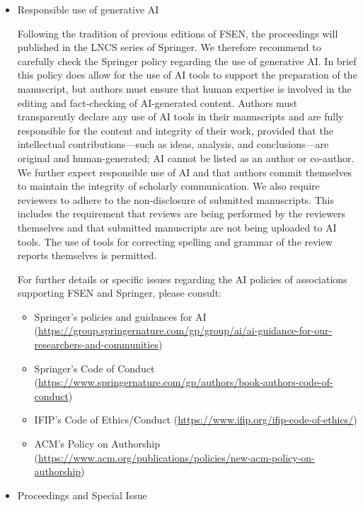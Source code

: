 \documentclass[prodmode,acmtecs]{acmsmall} %
\begin{document}
\begin{itemize}
\item  Responsible use of generative AI 
 
  Following the tradition of previous editions of FSEN, the proceedings will published in the LNCS series of Springer. We therefore recommend to carefully check the Springer policy regarding the use of generative AI. In brief this policy does allow for the use of AI tools to support the preparation of the manuscript, but authors must ensure that human expertise is involved in the editing and fact-checking of AI-generated content. Authors must transparently declare any use of AI tools in their manuscripts and are fully responsible for the content and integrity of their work, provided that the intellectual contributions—such as ideas, analysis, and conclusions—are original and human-generated; AI cannot be listed as an author or co-author. We further expect responsible use of AI and that authors commit themselves to maintain the integrity of scholarly communication. We also require reviewers to adhere to the non-disclosure of submitted manuscripts. This includes the requirement that reviews are being performed by the reviewers themselves and that submitted manuscripts are not being uploaded to AI tools. The use of tools for correcting spelling and grammar of the review reports themselves is permitted. 
 
  For further details or specific issues regarding the AI policies of associations supporting FSEN and Springer, please consult: 
 
\begin{itemize}\item  Springer’s policies and guidances for AI (\href{https://group.springernature.com/gp/group/ai/ai-guidance-for-our-researchers-and-communities}{https://group.springernature.com/gp/group/ai/ai-guidance-for-our-researchers-and-communities})
\item  Springer’s Code of Conduct (\href{https://www.springernature.com/gp/authors/book-authors-code-of-conduct}{https://www.springernature.com/gp/authors/book-authors-code-of-conduct})
\item  IFIP's Code of Ethics/Conduct (\href{https://www.ifip.org/ifip-code-of-ethics/}{https://www.ifip.org/ifip-code-of-ethics/})
\item  ACM's Policy on Authorship (\href{https://www.acm.org/publications/policies/new-acm-policy-on-authorship}{https://www.acm.org/publications/policies/new-acm-policy-on-authorship})
\end{itemize} 
\item  Proceedings and Special Issue 
 

\end{itemize}
\end{document}
